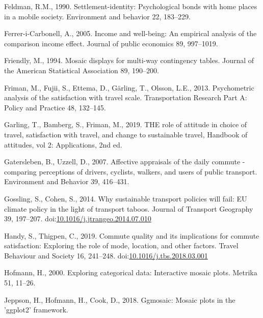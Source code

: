 \documentclass[]{elsarticle} %
\begin{document}
\leavevmode\hypertarget{ref-Feldman1990settlement}{}%
Feldman, R.M., 1990. Settlement-identity: Psychological bonds with home
places in a mobile society. Environment and behavior 22, 183--229.

\leavevmode\hypertarget{ref-Ferrer2005income}{}%
Ferrer-i-Carbonell, A., 2005. Income and well-being: An empirical
analysis of the comparison income effect. Journal of public economics
89, 997--1019.

\leavevmode\hypertarget{ref-Friendly1994mosaic}{}%
Friendly, M., 1994. Mosaic displays for multi-way contingency tables.
Journal of the American Statistical Association 89, 190--200.

\leavevmode\hypertarget{ref-Friman2013psychometric}{}%
Friman, M., Fujii, S., Ettema, D., Gärling, T., Olsson, L.E., 2013.
Psychometric analysis of the satisfaction with travel scale.
Transportation Research Part A: Policy and Practice 48, 132--145.

\leavevmode\hypertarget{ref-Garling2019role}{}%
Garling, T., Bamberg, S., Friman, M., 2019. THE role of attitude in
choice of travel, satisfaction with travel, and change to sustainable
travel, Handbook of attitudes, vol 2: Applications, 2nd ed.

\leavevmode\hypertarget{ref-Gatersleben2007affective}{}%
Gatersleben, B., Uzzell, D., 2007. Affective appraisals of the daily
commute - comparing perceptions of drivers, cyclists, walkers, and users
of public transport. Environment and Behavior 39, 416--431.

\leavevmode\hypertarget{ref-Gossling2014sustainable}{}%
Gossling, S., Cohen, S., 2014. Why sustainable transport policies will
fail: EU climate policy in the light of transport taboos. Journal of
Transport Geography 39, 197--207.
doi:\href{https://doi.org/10.1016/j.jtrangeo.2014.07.010}{10.1016/j.jtrangeo.2014.07.010}

\leavevmode\hypertarget{ref-Handy2019commute}{}%
Handy, S., Thigpen, C., 2019. Commute quality and its implications for
commute satisfaction: Exploring the role of mode, location, and other
factors. Travel Behaviour and Society 16, 241--248.
doi:\href{https://doi.org/10.1016/j.tbs.2018.03.001}{10.1016/j.tbs.2018.03.001}

\leavevmode\hypertarget{ref-Hofmann2000exploring}{}%
Hofmann, H., 2000. Exploring categorical data: Interactive mosaic plots.
Metrika 51, 11--26.

\leavevmode\hypertarget{ref-Jeppson2019ggmosaic}{}%
Jeppson, H., Hofmann, H., Cook, D., 2018. Ggmosaic: Mosaic plots in the
'ggplot2' framework.
\end{document}
